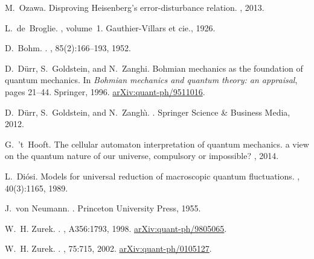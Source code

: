 \documentclass[11pt]{amsart}
\theoremstyle{definition}
\theoremstyle{plain}
\begin{document}
\begin{thebibliography}{10}
M.~Ozawa.
\newblock Disproving {H}eisenberg's error-disturbance relation.
, 2013.

L.~de~Broglie.
, volume~1.
\newblock Gauthier-Villars et cie., 1926.

D.~Bohm.
.
, 85(2):166--193, 1952.

D.~D{\"u}rr, S.~Goldstein, and N.~Zanghi.
\newblock Bohmian mechanics as the foundation of quantum mechanics.
\newblock In {\em Bohmian mechanics and quantum theory: an appraisal}, pages
  21--44. Springer, 1996.
\newblock \href{http://arxiv.org/abs/quant-ph/9511016}{arXiv:quant-ph/9511016}.

D.~D{\"u}rr, S.~Goldstein, and N.~Zangh{\`\i}.
.
\newblock Springer Science \& Business Media, 2012.

G.~'t~Hooft.
\newblock The cellular automaton interpretation of quantum mechanics. a view on
  the quantum nature of our universe, compulsory or impossible?
, 2014.

L.~Di{\'o}si.
\newblock Models for universal reduction of macroscopic quantum fluctuations.
, 40(3):1165, 1989.

J.~von Neumann.
.
\newblock Princeton University Press, 1955.

W.~H. Zurek.
.
, A356:1793, 1998.
\newblock \href{http://arxiv.org/abs/quant-ph/9805065}{arXiv:quant-ph/9805065}.

W.~H. Zurek.
.
, 75:715, 2002.
\newblock \href{http://arxiv.org/abs/quant-ph/0105127}{arXiv:quant-ph/0105127}.


\end{thebibliography}
\end{document}

